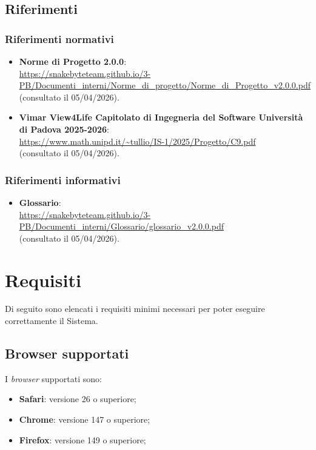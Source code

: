 \documentclass[10pt, letterpaper]{article}
\begin{document}
\subsection{Riferimenti}
\subsubsection{Riferimenti normativi}
\begin{itemize}
    \item \textbf{Norme di Progetto 2.0.0}:
          \\ \url{https://snakebyteteam.github.io/3-PB/Documenti_interni/Norme_di_progetto/Norme_di_Progetto_v2.0.0.pdf}
          \\ (consultato il 05/04/2026).
    \item \textbf{Vimar View4Life Capitolato di Ingegneria del Software Università di Padova 2025-2026}:
          \\ \url{https://www.math.unipd.it/~tullio/IS-1/2025/Progetto/C9.pdf}
          \\ (consultato il 05/04/2026).
\end{itemize}

\subsubsection{Riferimenti informativi}
\begin{itemize}
    \item \textbf{Glossario}:
      \\ \url{https://snakebyteteam.github.io/3-PB/Documenti_interni/Glossario/glossario_v2.0.0.pdf} 
      \\ (consultato il 05/04/2026).
\end{itemize}

\section{Requisiti}
\label{sec:requisiti}

Di seguito sono elencati i requisiti minimi necessari per poter eseguire correttamente il Sistema.

\subsection{Browser supportati}
\label{sec:browsers}

I \textit{browser} supportati sono:

\begin{itemize}
    \item   \textbf{Safari}: versione 26 o superiore;
    \item   \textbf{Chrome}: versione 147 o superiore;
    \item   \textbf{Firefox}: versione 149 o superiore;
\end{itemize}
\end{document}
